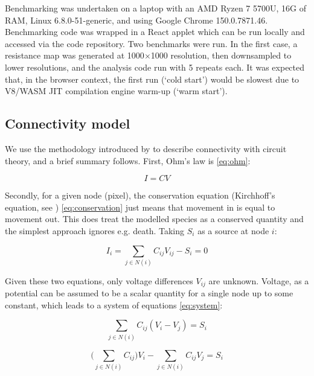 \documentclass[11pt, a4paper]{article}
\begin{document}
Benchmarking was undertaken on a laptop with an AMD Ryzen 7 5700U, 16G of RAM, Linux 6.8.0-51-generic, and using Google Chrome 150.0.7871.46.
Benchmarking code was wrapped in a React applet which can be run locally and accessed via the code repository. Two benchmarks were run. 
In the first case, a resistance map was generated at 1000$\times$1000 resolution, then downsampled to lower resolutions, and the analysis code run with 5 repeats each.
It was expected that, in the browser context, the first run (`cold start') would be slowest due to V8/WASM JIT compilation engine warm-up (`warm start').

\subsection{Connectivity model}

We use the methodology introduced by \cite{mcrae2006isolation} to describe connectivity with circuit theory, and a brief summary follows. First, Ohm's law \cite[Ch. 2]{alexander2007fundamentals} is \eqref{eq:ohm}:

\begin{equation}
\label{eq:ohm}
I = CV
\end{equation}

Secondly, for a given node (pixel), the conservation equation (Kirchhoff's equation, see \cite[Ch. 2]{alexander2007fundamentals}) \eqref{eq:conservation} just means that movement in is equal to movement out. This does treat the modelled species as a conserved quantity and the simplest approach ignores e.g. death. Taking $S_i$ as a source at node $i$:

\begin{equation}
\label{eq:conservation}
I_i = \sum_{j \in N(i)} C_{ij}V_{ij} - S_i = 0
\end{equation}

Given these two equations, only voltage differences $V_{ij}$ are unknown. Voltage, as a potential can be assumed to be a scalar quantity for a single node up to some constant, which leads to a system of equations \eqref{eq:system}:

\begin{equation}
\sum_{j \in N(i)} C_{ij}(V_i - V_j) = S_i
\end{equation}

\begin{equation}
\Big(\sum_{j \in N(i)} C_{ij}\Big)V_i - \sum_{j \in N(i)} C_{ij}V_j = S_i
\end{equation}
\end{document}
